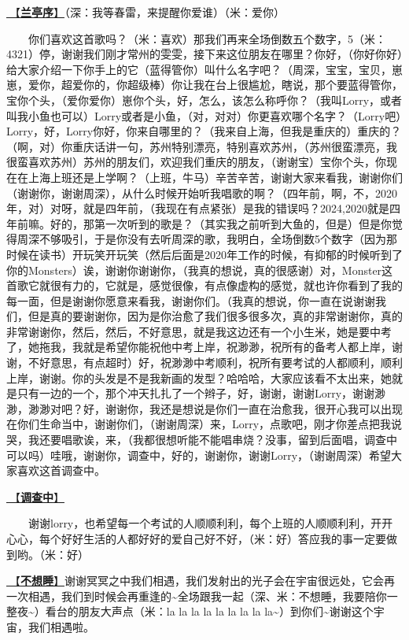 \documentclass[]{ctexbook}
\begin{document}
\hyperref[lantingxu]{🎵【\textbf{兰亭序}】}（深：我等春雷，来提醒你爱谁）（米：爱你）

  你们喜欢这首歌吗？（米：喜欢）那我们再来全场倒数五个数字，5（米：4321）停，谢谢我们刚才常州的雯雯，接下来这位朋友在哪里？你好，（你好你好）给大家介绍一下你手上的它（蓝得管你）叫什么名字吧？（周深，宝宝，宝贝，崽崽，爱你，超爱你的，你超级棒）你让我在台上很尴尬，瞎说，那个要蓝得管你，宝你个头，（爱你爱你）崽你个头，好，怎么，该怎么称呼你？（我叫Lorry，或者叫我小鱼也可以）Lorry或者是小鱼，（对，对对）你更喜欢哪个名字？（Lorry吧）Lorry，好，Lorry你好，你来自哪里的？（我来自上海，但我是重庆的）重庆的？（啊，对）你重庆话讲一句，苏州特别漂亮，特别喜欢苏州，（苏州很蛮漂亮，我很蛮喜欢苏州）苏州的朋友们，欢迎我们重庆的朋友，（谢谢宝）宝你个头，你现在在上海上班还是上学啊？（上班，牛马）辛苦辛苦，谢谢大家来看我，谢谢你们（谢谢你，谢谢周深），从什么时候开始听我唱歌的啊？（四年前，啊，不，2020年，对）对呀，就是四年前，（我现在有点紧张）是我的错误吗？2024,2020就是四年前嘛。好的，那第一次听到的歌是？（其实我之前听到大鱼的，但是）但是你觉得周深不够吸引，于是你没有去听周深的歌，我明白，全场倒数5个数字（因为那时候在读书）开玩笑开玩笑（然后后面是2020年工作的时候，有抑郁的时候听到了你的Monsters）诶，谢谢你谢谢你，（我真的想说，真的很感谢）对，Monster这首歌它就很有力的，它就是，感觉很像，有点像虚构的感觉，就也许你看到了我的每一面，但是谢谢你愿意来看我，谢谢你们。（我真的想说，你一直在说谢谢我们，但是真的要谢谢你，因为是你治愈了我们很多很多次，真的非常谢谢你，真的非常谢谢你，然后，然后，不好意思，就是我这边还有一个小生米，她是要中考了，她拖我，我就是希望你能祝他中考上岸，祝渺渺，祝所有的备考人都上岸，谢谢，不好意思，有点超时）好，祝渺渺中考顺利，祝所有要考试的人都顺利，顺利上岸，谢谢。你的头发是不是我新画的发型？哈哈哈，大家应该看不太出来，她就是只有一边的一个，那个冲天扎扎了一个辫子，好，谢谢，谢谢Lorry，谢谢渺渺，渺渺对吧？好，谢谢你，我还是想说是你们一直在治愈我，很开心我可以出现在你们生命当中，谢谢你们，（谢谢周深）来，Lorry，点歌吧，刚才你差点把我说哭，我还要唱歌诶，来，（我都很想听能不能唱串烧？没事，留到后面唱，调查中可以吗）哇哦，谢谢你，调查中，好的，谢谢你，谢谢Lorry，（谢谢周深）希望大家喜欢这首调查中。

\hyperref[diaochazhong]{🎵【\textbf{调查中}】}

  谢谢lorry，也希望每一个考试的人顺顺利利，每个上班的人顺顺利利，开开心心，每个好好生活的人都好好的爱自己好不好，（米：好）答应我的事一定要做到哟。（米：好）

\hyperref[keep-playing]{🎵【\textbf{不想睡}】}谢谢冥冥之中我们相遇，我们发射出的光子会在宇宙很远处，它会再一次相遇，我们到时候会再重逢的\textasciitilde 全场跟我一起（深、米：不想睡，我要陪你一整夜\textasciitilde）看台的朋友大声点（米：la la la la la la la la la\textasciitilde）到你们\textasciitilde 谢谢这个宇宙，我们相遇啦。
\end{document}
